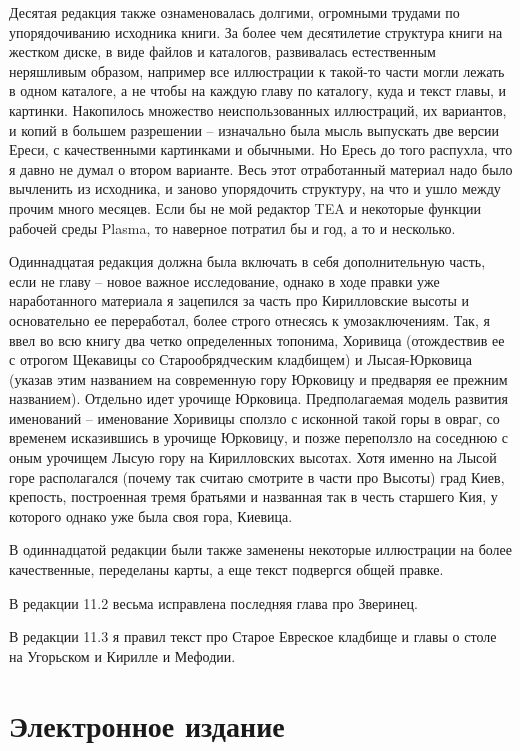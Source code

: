Десятая редакция также ознаменовалась долгими, огромными трудами по упорядочиванию исходника книги. За более чем десятилетие структура книги на жестком диске, в виде файлов и каталогов, развивалась естественным неряшливым образом, например все иллюстрации к такой-то части могли лежать в одном каталоге, а не чтобы на каждую главу по каталогу, куда и текст главы, и картинки. Накопилось множество неиспользованных иллюстраций, их вариантов, и копий в большем разрешении – изначально была мысль выпускать две версии Ереси, с качественными картинками и обычными. Но Ересь до того распухла, что я давно не думал о втором варианте. Весь этот отработанный материал надо было вычленить из исходника, и заново упорядочить структуру, на что и ушло между прочим много месяцев. Если бы не мой редактор TEA и некоторые функции рабочей среды Plasma, то наверное потратил бы и год, а то и несколько.

Одиннадцатая редакция должна была включать в себя дополнительную часть, если не главу – новое важное исследование, однако в ходе правки уже наработанного материала я зацепился за часть про Кирилловские высоты и основательно ее переработал, более строго отнесясь к умозаключениям. Так, я ввел во всю книгу два четко определенных топонима, Хоривица (отождествив ее с отрогом Щекавицы со Старообрядческим кладбищем) и Лысая-Юрковица (указав этим названием на современную гору Юрковицу и предваряя ее прежним названием). Отдельно идет урочище Юрковица. Предполагаемая модель развития именований – именование Хоривицы сползло с исконной такой горы в овраг, со временем исказившись в урочище Юрковицу, и позже переползло на соседнюю с оным урочищем Лысую гору на Кирилловских высотах. Хотя именно на Лысой горе располагался (почему так считаю смотрите в части про Высоты) град Киев, крепость, построенная тремя братьями и названная так в честь старшего Кия, у которого однако уже была своя гора, Киевица.

В одиннадцатой редакции были также заменены некоторые иллюстрации на более качественные, переделаны карты, а еще текст подвергся общей правке.

В редакции 11.2 весьма исправлена последняя глава про Зверинец.

В редакции 11.3 я правил текст про Старое Евреское кладбище и главы о столе на Угорьском и Кирилле и Мефодии.


\section*{Электронное издание} 

